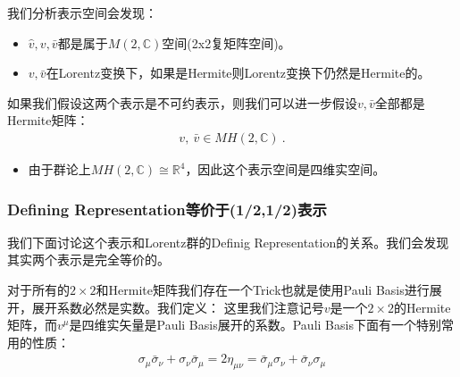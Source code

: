 \bigskip
{}

我们分析表示空间会发现：
\begin{itemize}
  \item $ \hat{v},v,\bar{v} $都是属于$ M(2,\mathbb{C}) $空间(2x2复矩阵空间)。
  \item $ v, \bar{v} $在Lorentz变换下，如果是Hermite则Lorentz变换下仍然是Hermite的。
\end{itemize}
如果我们假设这两个表示是不可约表示，则我们可以进一步假设$ v, \bar{v} $全部都是Hermite矩阵：
\begin{align}
  v,\mathrm{~}\bar{v}\in MH(2,\mathbb{C})\mathrm{~.}
\end{align}
\begin{itemize}
  \item 由于群论上$ MH(2,\mathbb{C}) \cong \mathbb{R}^4 $，因此这个表示空间是四维实空间。
\end{itemize}

\subsubsection{Defining Representation等价于(1/2,1/2)表示}
我们下面讨论这个表示和Lorentz群的Definig Representation的关系。我们会发现其实两个表示是完全等价的。

\bigskip
{}

对于所有的$ 2 \times 2 $和Hermite矩阵我们存在一个Trick也就是使用Pauli Basis进行展开，展开系数必然是实数。我们定义：
这里我们注意记号$ v $是一个$ 2 \times 2 $的Hermite矩阵，而$ v^\mu $是四维实矢量是Pauli Basis展开的系数。Pauli Basis下面有一个特别常用的性质：
\begin{align}
  \sigma_\mu\bar{\sigma}_\nu+\sigma_\nu\bar{\sigma}_\mu=2\eta_{\mu\nu}=\bar{\sigma}_\mu\sigma_\nu+\bar{\sigma}_\nu\sigma_\mu
\end{align}

